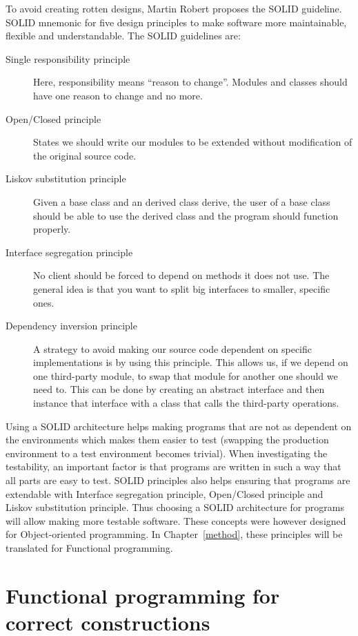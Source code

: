 To avoid creating rotten designs, Martin Robert proposes the SOLID guideline.
SOLID mnemonic for five design principles to make software more maintainable,
flexible and understandable. The SOLID guidelines are:

\begin{description}
    \item [Single responsibility principle] Here, responsibility means ``reason
        to change''. Modules and classes should have one reason to change and no
        more.
    \item [Open/Closed principle] States we should write our modules to be
        extended without modification of the original source code.
    \item [Liskov substitution principle] Given a base class and an derived
        class derive, the user of a base class should be able to use the derived
        class and the program should function properly.
    \item [Interface segregation principle] No client should be forced to depend
        on methods it does not use. The general idea is that you want to split
        big interfaces to smaller, specific ones.
    \item [Dependency inversion principle] A strategy to avoid making our source
        code dependent on specific implementations is by using this principle.
        This allows us, if we depend on one third-party module, to swap that
        module for another one should we need to. This can be done by creating
        an abstract interface and then instance that interface with a class that
        calls the third-party operations.~\cite{martinrobert}
\end{description}

Using a SOLID architecture helps making programs that are not as dependent on
the environments which makes them easier to test (swapping the production
environment to a test environment becomes trivial). When investigating the
testability, an important factor is that programs are written in such a way
that all parts are easy to test. SOLID principles also helps ensuring that
programs are extendable with Interface segregation principle, Open/Closed
principle and Liskov substitution principle. Thus choosing a SOLID architecture
for programs will allow making more testable software. These concepts were
however designed for Object-oriented programming. In Chapter~\ref{method},
these principles will be translated for Functional programming. 

\section{Functional programming for correct constructions}


